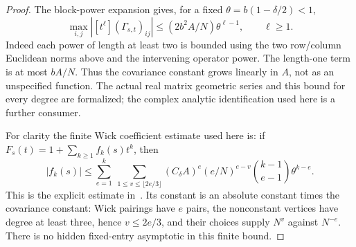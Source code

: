 \begin{proof}
The block-power expansion gives, for a fixed
\(\theta=b(1-\delta/2)<1\),
\[
 \max_{i,j}|[t^\ell](\Gamma_{s,t})_{ij}|
       \leq(2b^2 A/N)\theta^{\ell-1},
 \qquad \ell\geq1.
\]
Indeed each power of length at least two is bounded using
the two row/column Euclidean norms above and the intervening
operator power. The length-one term is at most \(bA/N\).
Thus the covariance constant grows linearly in \(A\),
not as an unspecified function. The actual real matrix geometric
series and this bound for every degree are formalized; the complex
analytic identification used here is a further consumer.

For clarity the finite Wick coefficient estimate used here is:
if \(F_s(t)=1+\sum_{k\geq1}f_k(s)t^k\), then
\[
 |f_k(s)|\leq
 \sum_{e=1}^k\ \sum_{1\leq v\leq\lfloor2e/3\rfloor}
 (C_\delta A)^e(e/N)^{e-v}
                  \binom{k-1}{e-1}\theta^{k-e}.
\]
This is the explicit estimate in~\cite[Lemma 3.7]{DW}.
Its constant is an absolute constant times the covariance
constant: Wick pairings have \(e\) pairs, the nonconstant
vertices have degree at least three, hence \(v\leq2e/3\),
and their choices supply \(N^v\) against \(N^{-e}\).
There is no hidden fixed-entry asymptotic in this finite bound.


\end{proof}
